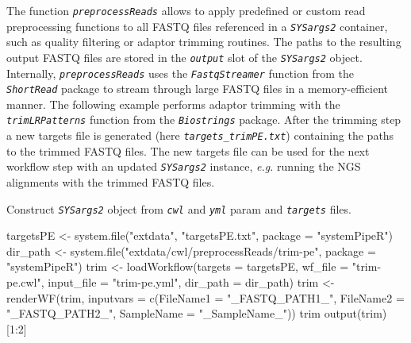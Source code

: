 \documentclass[14pt,]{article}
\newcommand{\hlnum}[1]{\textcolor[rgb]{0.816,0.125,0.439}{#1}}%
\newcommand{\hlstr}[1]{\textcolor[rgb]{0.251,0.627,0.251}{#1}}%
\newcommand{\hlopt}[1]{\textcolor[rgb]{0,0,0}{#1}}%
\newcommand{\hlstd}[1]{\textcolor[rgb]{0.251,0.251,0.251}{#1}}%
\newcommand{\hlkwc}[1]{\textcolor[rgb]{0.251,0.251,0.251}{#1}}%
\newcommand{\hlkwd}[1]{\textcolor[rgb]{0.878,0.439,0.125}{#1}}%
\newenvironment{Shaded}{\begin{myshaded}}{\end{myshaded}}
\newcommand{\KeywordTok}[1]{\hlkwd{#1}}
\newcommand{\DataTypeTok}[1]{\hlkwc{#1}}
\newcommand{\DecValTok}[1]{\hlnum{#1}}
\newcommand{\StringTok}[1]{\hlstr{#1}}
\newcommand{\OperatorTok}[1]{\hlopt{#1}}
\newcommand{\NormalTok}[1]{\hlstd{#1}}
\begin{document}
The function \emph{\texttt{preprocessReads}} allows to apply predefined or custom
read preprocessing functions to all FASTQ files referenced in a
\emph{\texttt{SYSargs2}} container, such as quality filtering or adaptor trimming
routines. The paths to the resulting output FASTQ files are stored in the
\emph{\texttt{output}} slot of the \emph{\texttt{SYSargs2}} object. Internally,
\emph{\texttt{preprocessReads}} uses the \emph{\texttt{FastqStreamer}} function from
the \emph{\texttt{ShortRead}} package to stream through large FASTQ files in a
memory-efficient manner. The following example performs adaptor trimming with
the \emph{\texttt{trimLRPatterns}} function from the \emph{\texttt{Biostrings}} package.
After the trimming step a new targets file is generated (here
\emph{\texttt{targets\_trimPE.txt}}) containing the paths to the trimmed FASTQ files.
The new targets file can be used for the next workflow step with an updated
\emph{\texttt{SYSargs2}} instance, \emph{e.g.} running the NGS alignments with the
trimmed FASTQ files.

Construct \emph{\texttt{SYSargs2}} object from \emph{\texttt{cwl}} and \emph{\texttt{yml}} param and \emph{\texttt{targets}} files.

\begin{Shaded}
\begin{Highlighting}[]
\NormalTok{targetsPE <-}\StringTok{ }\KeywordTok{system.file}\NormalTok{(}\StringTok{"extdata"}\NormalTok{, }\StringTok{"targetsPE.txt"}\NormalTok{, }\DataTypeTok{package =} \StringTok{"systemPipeR"}\NormalTok{)}
\NormalTok{dir_path <-}\StringTok{ }\KeywordTok{system.file}\NormalTok{(}\StringTok{"extdata/cwl/preprocessReads/trim-pe"}\NormalTok{, }\DataTypeTok{package =} \StringTok{"systemPipeR"}\NormalTok{)}
\NormalTok{trim <-}\StringTok{ }\KeywordTok{loadWorkflow}\NormalTok{(}\DataTypeTok{targets =}\NormalTok{ targetsPE, }\DataTypeTok{wf_file =} \StringTok{"trim-pe.cwl"}\NormalTok{, }\DataTypeTok{input_file =} \StringTok{"trim-pe.yml"}\NormalTok{, }
    \DataTypeTok{dir_path =}\NormalTok{ dir_path)}
\NormalTok{trim <-}\StringTok{ }\KeywordTok{renderWF}\NormalTok{(trim, }\DataTypeTok{inputvars =} \KeywordTok{c}\NormalTok{(}\DataTypeTok{FileName1 =} \StringTok{"_FASTQ_PATH1_"}\NormalTok{, }\DataTypeTok{FileName2 =} \StringTok{"_FASTQ_PATH2_"}\NormalTok{, }
    \DataTypeTok{SampleName =} \StringTok{"_SampleName_"}\NormalTok{))}
\NormalTok{trim}
\KeywordTok{output}\NormalTok{(trim)[}\DecValTok{1}\OperatorTok{:}\DecValTok{2}\NormalTok{]}
\end{Highlighting}
\end{Shaded}
\end{document}
